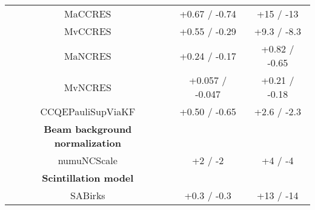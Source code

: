 \begin{table*}[t]
\begin{tabular}{c c c}
    MaCCRES& +0.67 / -0.74& +15 / -13 \\
    MvCCRES& +0.55 / -0.29& +9.3 / -8.3 \\
    MaNCRES& +0.24 / -0.17& +0.82 / -0.65 \\
    MvNCRES& +0.057 / -0.047& +0.21 / -0.18 \\
    CCQEPauliSupViaKF& +0.50 / -0.65& +2.6 / -2.3 \\
    \hline
    \textbf{Beam background normalization} & & \\
    numuNCScale& +2 / -2& +4 / -4 \\
    \textbf{Scintillation model} & & \\
    SABirks& +0.3 / -0.3& +13 / -14 \\
    \hline 
  \end{tabular}
  \label{tab:systShifts}
\end{table*}



